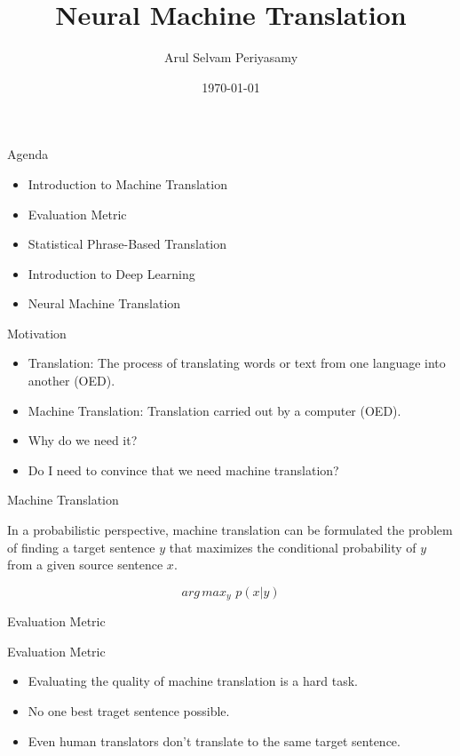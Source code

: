 ﻿\documentclass[table,aspectratio=43,mathserif,xcolor={usenames,dvipsnames,svgnames,table},10pt]{beamer}
\title[NMT]{Neural Machine Translation}
\author[Arul Selvam Periyasamy]{Arul Selvam Periyasamy}
\institute[University of Bonn]{Rheinische Friedrich-Wilhelms-Universit\"at Bonn\\
Seminar: Natural Language Processing}
\date{\today}
\begin{document}
\maketitle


\begin{frame}{Agenda}
 \begin{itemize}
  \item<+-> Introduction to Machine Translation
  \item<+-> Evaluation Metric
  \item<+-> Statistical Phrase-Based Translation
  \item<+-> Introduction to Deep Learning
  \item<+-> Neural Machine Translation

 \end{itemize}
\end{frame}

\begin{frame}{Motivation}
\begin{itemize}
 \item<+-> Translation: The process of translating words or text from one language into another (OED).
 \item<+-> Machine Translation: Translation carried out by a computer (OED).
 \item<+-> Why do we need it?
 \item<+-> Do I need to convince that we need machine translation?
\end{itemize}
\end{frame}


\begin{frame}{Machine Translation}

In a probabilistic perspective, machine translation can be formulated the problem of finding a target sentence $y$ that maximizes the conditional probability of $y$ from a given source sentence $x$.

$$ arg\,max _{y}  \,\, p(x|y)$$
\end{frame}


\begin{section}{Evaluation Metric}
\end{section}

\begin{frame}{Evaluation Metric}
\begin{itemize}
 \item<+-> Evaluating the quality of machine translation is a hard task.
 \item<+-> No one best traget sentence possible.
 \item<+-> Even human translators don't translate to the same target sentence.
 \end{itemize}
\end{frame}
\end{document}
